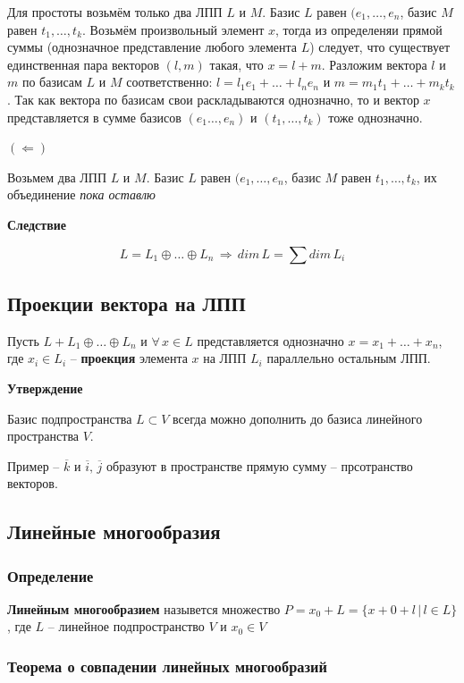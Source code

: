 \documentclass{article}
\begin{document}
\begin{enumerate}
    Для простоты возьмём только два ЛПП $L$ и $M$. Базис $L$ равен $(e_1,\ldots,e_n$, базис $M$ равен $t_1,\ldots,t_k$. Возьмём произвольный элемент $x$, тогда из определеняи прямой суммы (однозначное представление любого элемента $L$) следует, что существует единственная пара векторов $(l,m)$ такая, что $x=l+m$. Разложим вектора $l$ и $m$ по базисам $L$ и $M$ соответственно: $l=l_1e_1+\ldots+l_n e_n$ и $m=m_1t_1+\ldots+m_k t_k$. Так как вектора по базисам свои раскладываются однозначно, то и вектор $x$ представляется в сумме базисов $(e_1\ldots,e_n)$ и $(t_1,\ldots,t_k)$ тоже однозначно.
    
    $(\Leftarrow)$
    
    Возьмем два ЛПП $L$ и $M$. Базис $L$ равен $(e_1,\ldots,e_n$, базис $M$ равен $t_1,\ldots,t_k$, их объединение \textit{пока оставлю}
\end{enumerate}
\textbf{Следствие}

$$L=L_1\oplus \ldots\oplus L_n\,\Rightarrow\,dim\,L=\sum dim\,L_i$$
\subsection{Проекции вектора на ЛПП}
Пусть $L+L_1\oplus\ldots\oplus L_n$ и $\forall\,x\in L$ представляется однозначно $x=x_1+\ldots+x_n$, где $x_i\in L_i$ -- \textbf{проекция} элемента $x$ на ЛПП $L_i$ параллельно остальным ЛПП.

\textbf{Утверждение}

Базис подпространства $L\subset V$ всегда можно дополнить до базиса линейного пространства $V$.

Пример -- $\overline{k}$ и $\overline{i},\,\overline{j}$ образуют в пространстве прямую сумму -- прсотранство векторов.
\newpage
\subsection{Линейные многообразия}
\subsubsection{Определение}
\textbf{Линейным многообразием} назывется множество $P=x_0+L=\{x+0+l\,|\,l\in L\}$, где $L$ -- линейное подпространство $V$ и $x_0\in V$

\subsubsection{Теорема о совпадении линейных многообразий}
\end{document}
